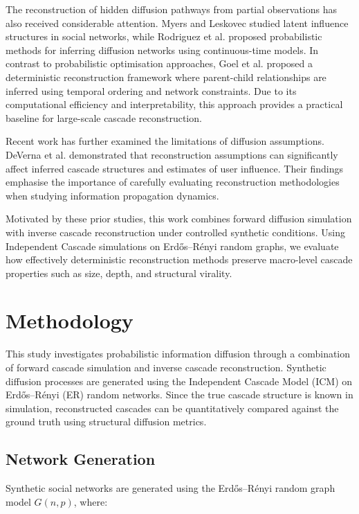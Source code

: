 \documentclass{article}
\begin{document}
The reconstruction of hidden diffusion pathways from partial observations has also received considerable attention. Myers and Leskovec \citep{myers2014information} studied latent influence structures in social networks, while Rodriguez et al. \citep{rodriguez2011uncovering} proposed probabilistic methods for inferring diffusion networks using continuous-time models. In contrast to probabilistic optimisation approaches, Goel et al. \citep{goel2016structural} proposed a deterministic reconstruction framework where parent-child relationships are inferred using temporal ordering and network constraints. Due to its computational efficiency and interpretability, this approach provides a practical baseline for large-scale cascade reconstruction.

Recent work has further examined the limitations of diffusion assumptions. DeVerna et al. \citep{deverna2024information} demonstrated that reconstruction assumptions can significantly affect inferred cascade structures and estimates of user influence. Their findings emphasise the importance of carefully evaluating reconstruction methodologies when studying information propagation dynamics.

Motivated by these prior studies, this work combines forward diffusion simulation with inverse cascade reconstruction under controlled synthetic conditions. Using Independent Cascade simulations on Erd\H{o}s--R\'enyi random graphs, we evaluate how effectively deterministic reconstruction methods preserve macro-level cascade properties such as size, depth, and structural virality.
\section{Methodology}

This study investigates probabilistic information diffusion through a combination of forward cascade simulation and inverse cascade reconstruction. Synthetic diffusion processes are generated using the Independent Cascade Model (ICM) on Erd\H{o}s--R\'enyi (ER) random networks. Since the true cascade structure is known in simulation, reconstructed cascades can be quantitatively compared against the ground truth using structural diffusion metrics.

\subsection{Network Generation}

Synthetic social networks are generated using the Erd\H{o}s--R\'enyi random graph model $G(n,p)$, where:
\end{document}
